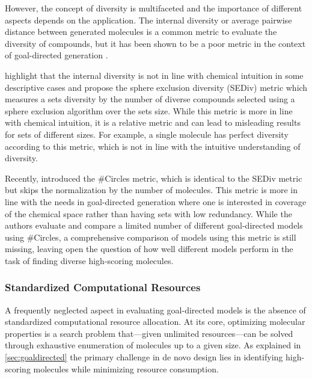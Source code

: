 However, the concept of diversity is multifaceted and the importance of different aspects depends on
the application. The internal diversity or average pairwise distance between generated molecules is
a common metric to evaluate the diversity of compounds, but it has been shown to be a poor metric in
the context of goal-directed generation
\citep{waldmanNovelAlgorithmsOptimization2000,xieMARSMarkovMolecular2021,thomasComparisonStructureLigandbased2021}.

\citet{thomasComparisonStructureLigandbased2021} highlight that the internal diversity is not in
line with chemical intuition in some descriptive cases and propose the sphere exclusion diversity
(SEDiv) metric which measures a sets diversity by the number of diverse compounds selected using a
sphere exclusion algorithm \citep{gobbiDISEDirectedSphere2003,sayle2DSimilarityDiversity2019} over the sets size. While this metric is more in line with chemical intuition, it is a
relative metric and can lead to misleading results for sets of different sizes. For example, a
single molecule has perfect diversity according to this metric, which is not in line with the
intuitive understanding of diversity.

Recently, \citet{xieHowMuchSpace2023} introduced the \#Circles metric, which is identical to the
SEDiv metric but skips the normalization by the number of molecules. This metric is more in line
with the needs in goal-directed generation where one is interested in coverage of the chemical space
rather than having sets with low redundancy. While the authors evaluate and compare a limited number
of different goal-directed models using \#Circles, a comprehensive comparison of models using this
metric is still missing, leaving open the question of how well different models perform in the task
of finding diverse high-scoring molecules.

\subsubsection{Standardized Computational Resources}
A frequently neglected aspect in evaluating goal-directed models is the absence of standardized
computational resource allocation. At its core, optimizing molecular properties is a search problem
that—given unlimited resources—can be solved through exhaustive enumeration of molecules up to a
given size. As explained in \cref{sec:goaldirected} the primary challenge in de novo design lies in identifying high-scoring
molecules while minimizing resource consumption.

